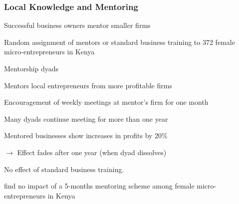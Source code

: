 \documentclass[hideothersubsections, usenames,dvipsnames,11pt]{beamer}
\newenvironment{itemize_2pt}{\itemize\addtolength{\itemsep}{2pt}}{\enditemize}
\begin{document}
\begin{frame}
\frametitle{Local Knowledge and Mentoring}

\begin{itemize_2pt}
	\item Successful business owners mentor smaller firms \citep{Brooks2018}
	\begin{itemize_2pt}
		\item Random assignment of mentors or standard business training to 372 female micro-entrepreneurs in Kenya
		\item Mentorship dyads
		\begin{itemize_2pt}
			\item Mentors local entrepreneurs from more profitable firms
			\item \textcolor{bdf}{Encouragement of weekly meetings at mentor's firm for one month}
			\item Many dyads continue meeting for more than one year
		\end{itemize_2pt}
		
		\item Mentored businesses show \textcolor{bdf}{increases in profits by 20\%}
		\item $\rightarrow$ \textcolor{bdf}{Effect fades after one year} (when dyad dissolves)
		\item No effect of standard business training.
		
		\vspace{0.5em}
		
		\item \citet{McKenziePuerto2021} find no impact of a 5-months mentoring scheme among female micro-entrepreneurs in Kenya
	\end{itemize_2pt}
\end{itemize_2pt}

\end{frame}
\end{document}
